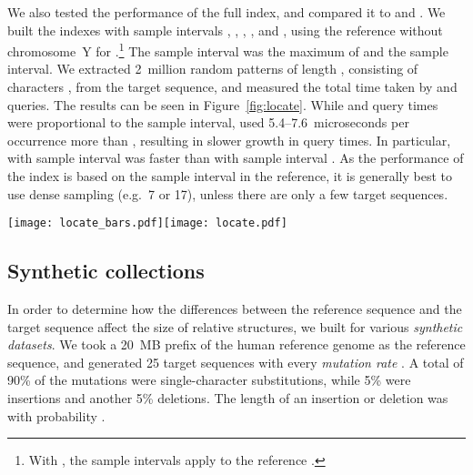 We also tested the \locate{} performance of the full \RFM{} index, and
compared it to \SSA{} and \SSArrr. We built the indexes with \SA{} sample
intervals , , , , and , using the reference without
chromosome~Y for \RFM.\footnote{With \RFM, the sample intervals apply
to the reference \SSA.} The \ISA{} sample interval was the
maximum of  and the \SA{} sample interval. We extracted 2~million
random patterns of length , consisting of characters , from
the target sequence, and measured the total time taken by \find{} and
\locate{} queries. The results can be seen in
Figure~\ref{fig:locate}. While \SSA{} and \SSArrr{} query times were
proportional to the sample interval, \RFM{} used 5.4\nobreakdash--7.6~microseconds
per occurrence more than \SSA{}, resulting in slower growth in query times.
In particular, \RFM{} with sample interval  was faster than
\SSA{} with sample interval . As the \locate{} performance of the \RFM{}
index is based on the sample interval in the reference, it is generally best
to use dense sampling (e.g.~7 or 17), unless there are only a few target
sequences.

\begin{figure*}
\begin{center}
\texttt{[image: locate\_bars.pdf]}\hspace{-0.6in}\texttt{[image: locate.pdf]}
\end{center}
\caption{Average \find{} and \locate{} times in microseconds per occurrence for 2~million patterns
of length  with a total of 255~million occurrences on NA12878 relative to
the human reference genome without chromosome~Y. Left: Query time vs.\ suffix array
sample interval. Right: Query time vs.\ index size in bits per character.}\label{fig:locate}
\end{figure*}

\subsection{Synthetic collections}

In order to determine how the differences between the reference sequence and
the target sequence affect the size of relative structures, we built \RCST{}
for various \emph{synthetic datasets}. We took a 20~MB prefix of the human
reference genome as the reference sequence, and generated 25 target
sequences with every \emph{mutation rate} . A total of 90\% of the mutations were single-character
substitutions, while 5\% were insertions and another 5\% deletions. The length of an
insertion or deletion was  with probability .

